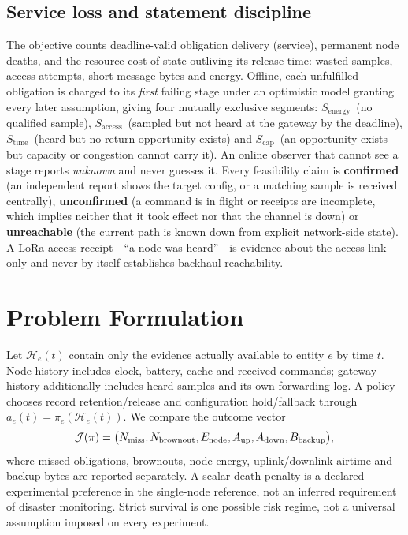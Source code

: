 \documentclass[journal,10pt]{IEEEtran}
\newcommand{\stime}{$S_{\mathrm{time}}$\xspace}
\newcommand{\scap}{$S_{\mathrm{cap}}$\xspace}
\newcommand{\senergy}{$S_{\mathrm{energy}}$\xspace}
\newcommand{\saccess}{$S_{\mathrm{access}}$\xspace}
\begin{document}
\subsection{Service loss and statement discipline}
The objective counts deadline-valid obligation delivery (service), permanent node deaths, and the
resource cost of state outliving its release time: wasted samples, access attempts, short-message
bytes and energy. Offline, each unfulfilled obligation is charged to its \emph{first} failing
stage under an optimistic model granting every later assumption, giving four mutually exclusive
segments: \senergy\ (no qualified sample), \saccess\ (sampled but not heard at the gateway by the
deadline), \stime\ (heard but no return opportunity exists) and \scap\ (an opportunity exists but
capacity or congestion cannot carry it). An online observer that cannot see a stage reports
\emph{unknown} and never guesses it. Every feasibility claim is \textbf{confirmed} (an independent
report shows the target config, or a matching sample is received centrally),
\textbf{unconfirmed} (a command is in flight or receipts are incomplete, which implies neither
that it took effect nor that the channel is down) or \textbf{unreachable} (the current path is
known down from explicit network-side state). A LoRa access receipt---``a node was heard''---is
evidence about the access link only and never by itself establishes backhaul reachability.

\section{Problem Formulation}
\label{sec:problem}

Let $\mathcal H_e(t)$ contain only the evidence actually available to entity $e$ by time $t$.
Node history includes clock, battery, cache and received commands; gateway history additionally
includes heard samples and its own forwarding log. A policy chooses record retention/release
and configuration hold/fallback through $a_e(t)=\pi_e(\mathcal H_e(t))$.
We compare the outcome vector
\begin{equation}
\mathcal J(\pi)=
\bigl(N_{\rm miss},N_{\rm brownout},E_{\rm node},A_{\rm up},A_{\rm down},B_{\rm backup}\bigr),
\label{eq:obj}
\end{equation}
where missed obligations, brownouts, node energy, uplink/downlink airtime and backup bytes are
reported separately. A scalar death penalty is a declared experimental preference in the
single-node reference, not an inferred requirement of disaster monitoring. Strict survival is
one possible risk regime, not a universal assumption imposed on every experiment.
\end{document}
